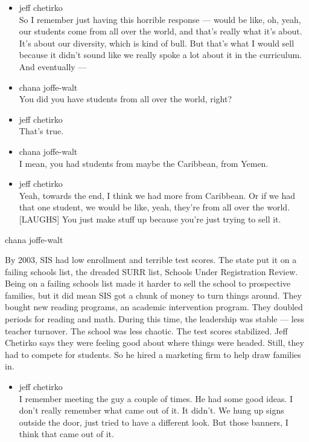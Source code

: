 \begin{itemize}
\item
  jeff chetirko\\
  So I remember just having this horrible response --- would be like,
  oh, yeah, our students come from all over the world, and that's really
  what it's about. It's about our diversity, which is kind of bull. But
  that's what I would sell because it didn't sound like we really spoke
  a lot about it in the curriculum. And eventually ---
\item
  chana joffe-walt\\
  You did you have students from all over the world, right?
\item
  jeff chetirko\\
  That's true.
\item
  chana joffe-walt\\
  I mean, you had students from maybe the Caribbean, from Yemen.
\item
  jeff chetirko\\
  Yeah, towards the end, I think we had more from Caribbean. Or if we
  had that one student, we would be like, yeah, they're from all over
  the world. {[}LAUGHS{]} You just make stuff up because you're just
  trying to sell it.
\end{itemize}

chana joffe-walt

By 2003, SIS had low enrollment and terrible test scores. The state put
it on a failing schools list, the dreaded SURR list, Schools Under
Registration Review. Being on a failing schools list made it harder to
sell the school to prospective families, but it did mean SIS got a chunk
of money to turn things around. They bought new reading programs, an
academic intervention program. They doubled periods for reading and
math. During this time, the leadership was stable --- less teacher
turnover. The school was less chaotic. The test scores stabilized. Jeff
Chetirko says they were feeling good about where things were headed.
Still, they had to compete for students. So he hired a marketing firm to
help draw families in.

\begin{itemize}
\tightlist
\item
  jeff chetirko\\
  I remember meeting the guy a couple of times. He had some good ideas.
  I don't really remember what came out of it. It didn't. We hung up
  signs outside the door, just tried to have a different look. But those
  banners, I think that came out of it.
\end{itemize}

